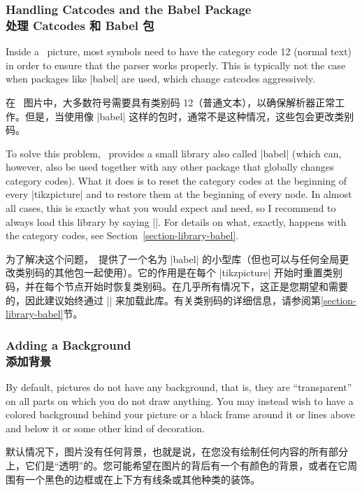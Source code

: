\subsubsection{Handling Catcodes and the Babel Package\\处理 Catcodes 和 Babel 包}

Inside a \tikzname\ picture, most symbols need to have the category code 12
(normal text) in order to ensure that the parser works properly. This is
typically not the case when packages like |babel| are used, which change
catcodes aggressively.


在 \tikzname\ 图片中，大多数符号需要具有类别码 12（普通文本），以确保解析器正常工作。但是，当使用像 |babel| 这样的包时，通常不是这种情况，这些包会更改类别码。

To solve this problem, \tikzname\ provides a small library also called |babel|
(which can, however, also be used together with any other package that globally
changes category codes). What it does is to reset the category codes at the
beginning of every |{tikzpicture}| and to restore them at the beginning of
every node. In almost all cases, this is exactly what you would expect and
need, so I recommend to always load this library by saying
|\usetikzlibrary{babel}|. For details on what, exactly, happens with the
category codes, see Section~\ref{section-library-babel}.

为了解决这个问题，\tikzname\ 提供了一个名为 |babel| 的小型库（但也可以与任何全局更改类别码的其他包一起使用）。它的作用是在每个 |{tikzpicture}| 开始时重置类别码，并在每个节点开始时恢复类别码。在几乎所有情况下，这正是您期望和需要的，因此建议始终通过 |\usetikzlibrary{babel}| 来加载此库。有关类别码的详细信息，请参阅第\ref{section-library-babel}节。


\subsubsection{Adding a Background\\添加背景}

By default, pictures do not have any background, that is, they are
``transparent'' on all parts on which you do not draw anything. You may instead
wish to have a colored background behind your picture or a black frame around
it or lines above and below it or some other kind of decoration.

默认情况下，图片没有任何背景，也就是说，在您没有绘制任何内容的所有部分上，它们是“透明”的。您可能希望在图片的背后有一个有颜色的背景，或者在它周围有一个黑色的边框或在上下方有线条或其他种类的装饰。

